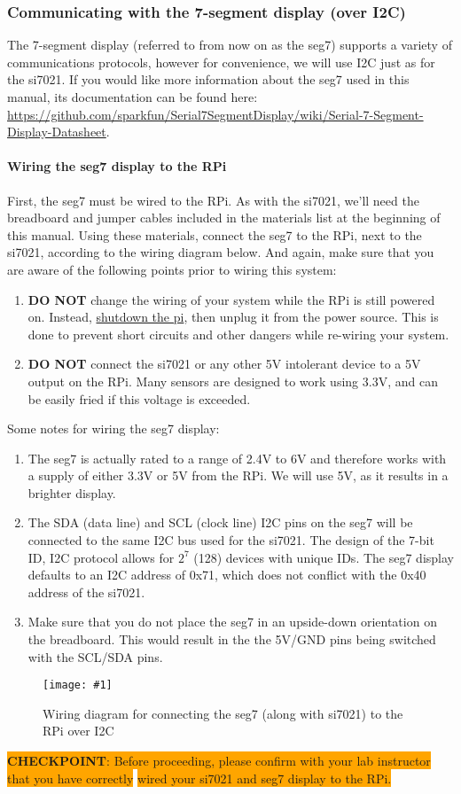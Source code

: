 \documentclass{article}
\newcommand{\imagefigb}[2]{
    \begin{figure}[H]
        \centering
        \texttt{[image: \#1]}
        \caption{#2}
    \end{figure}
}
\newcommand{\checkpoint}[2]{
    \newline \newline
    \noindent
    \colorbox{Orange}{\textbf{CHECKPOINT}: #1} \newline \colorbox{Orange}{#2}
    \newline \newline
}
\begin{document}
  \subsubsection{Communicating with the 7-segment display (over I2C)}
  The 7-segment display (referred to from now on as the seg7) supports a variety of communications protocols, however for convenience, we will use I2C just as for the si7021. If you would like more information about the seg7 used in this manual, its documentation can be found here: \newline\href{https://github.com/sparkfun/Serial7SegmentDisplay/wiki/Serial-7-Segment-Display-Datasheet}{https://github.com/sparkfun/Serial7SegmentDisplay/wiki/Serial-7-Segment-Display-Datasheet}.
    \paragraph{Wiring the seg7 display to the RPi}
    First, the seg7 must be wired to the RPi. As with the si7021, we'll need the breadboard and jumper cables included in the materials list at the beginning of this manual. Using these materials, connect the seg7 to the RPi, next to the si7021, according to the wiring diagram below. And again, make sure that you are aware of the following points prior to wiring this system:
    \begin{enumerate}
      \item \textbf{DO NOT} change the wiring of your system while the RPi is still powered on. Instead, \hyperref[sec:shutting-down]{shutdown the pi}, then unplug it from the power source. This is done to prevent short circuits and other dangers while re-wiring your system.
      \item \textbf{DO NOT} connect the si7021 or any other 5V intolerant device to a 5V output on the RPi. Many sensors are designed to work using 3.3V, and can be easily fried if this voltage is exceeded.
    \end{enumerate}
    Some notes for wiring the seg7 display:
    \begin{enumerate}
      \item The seg7 is actually rated to a range of 2.4V to 6V and therefore works with a supply of either 3.3V or 5V from the RPi. We will use 5V, as it results in a brighter display.
      \item The SDA (data line) and SCL (clock line) I2C pins on the seg7 will be connected to the same I2C bus used for the si7021. The design of the 7-bit ID, I2C protocol allows for $2^7$ (128) devices with unique IDs. The seg7 display defaults to an I2C address of 0x71, which does not conflict with the 0x40 address of the si7021.
      \item Make sure that you do not place the seg7 in an upside-down orientation on the breadboard. This would result in the the 5V/GND pins being switched with the SCL/SDA pins.
    \end{enumerate}
    \newline
    \noindent
    \imagefigb{si7021-seg7-wiring-diagram.png}{Wiring diagram for connecting the seg7 (along with si7021) to the RPi over I2C}
    \checkpoint{Before proceeding, please confirm with your lab instructor that you have correctly}{wired your si7021 and seg7 display to the RPi.}
\end{document}
